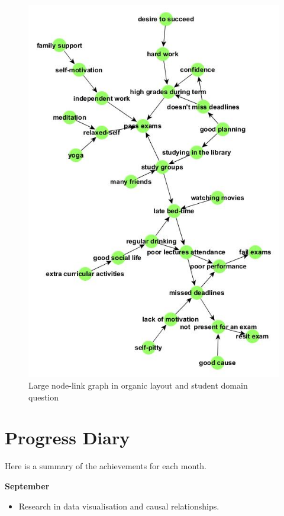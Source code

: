 \documentclass{l4proj}
\begin{document}
\begin{appendices}
\begin{figure}[H]
\centering
\includegraphics[width=12cm]{images/studentLargeOrganic.jpg}
\caption{Large node-link graph in organic layout and student domain question}
\label{studentLargeOrganic}
\end{figure}

\chapter{Progress Diary}

Here is a summary of the achievements for each month.

{\bfseries September}
\begin{itemize}
	\item Research in data visualisation and causal relationships.
\end{itemize}


\end{appendices}
\end{document}
